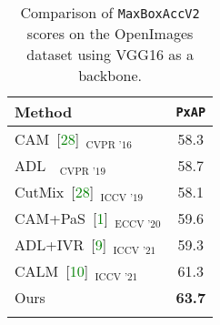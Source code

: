 \begin{table}[tbp]
  \centering
\begin{tabular}{lc}
    \Xhline{1pt}
    Method & \texttt{PxAP} \\
    \hline
    \hline
    CAM~[\textcolor{green}{28}]$_{\text{~~CVPR '16}}$ & 58.3 \\
    ADL~\cite{choe2019attention}$_{\text{~~CVPR '19}}$ & 58.7 \\  
    CutMix~[\textcolor{green}{28}]$_{\text{~~ICCV '19}}$ & 58.1 \\
    CAM+PaS~[\textcolor{green}{1}]$_{\text{~~ECCV '20}}$ & 59.6 \\   
    ADL+IVR~[\textcolor{green}{9}]$_{\text{~~ICCV '21}}$ & 59.3 \\
    CALM~[\textcolor{green}{10}]$_{\text{~~ICCV '21}}$ & 61.3 \\
    Ours & \textbf{63.7} \\
    \Xhline{1pt}
    \end{tabular}%
    \vspace{-0.5em}
     \caption{Comparison of \texttt{MaxBoxAccV2} scores on the OpenImages dataset using VGG16 as a backbone.}
  \label{tab:openimage_maxbox}
\end{table}%
